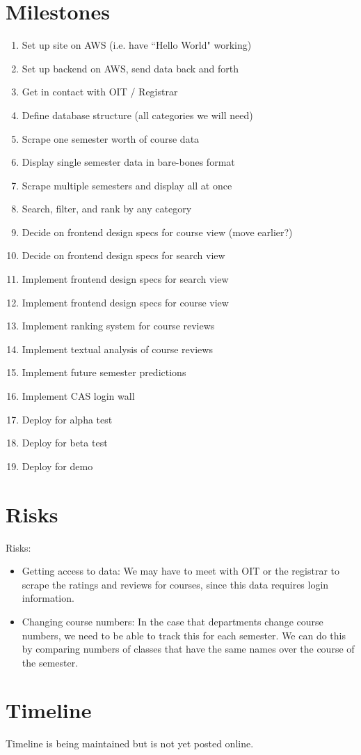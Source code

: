 \documentclass[11pt]{article}
\begin{document}
\section{Milestones}
\begin{enumerate}
\item Set up site on AWS (i.e. have ``Hello World" working)
\item Set up backend on AWS, send data back and forth
\item Get in contact with OIT / Registrar
\item Define database structure (all categories we will need)
\item Scrape one semester worth of course data
\item Display single semester data in bare-bones format
\item Scrape multiple semesters and display all at once
\item Search, filter, and rank by any category
\item Decide on frontend design specs for course view (move earlier?)
\item Decide on frontend design specs for search view
\par [No particular order from here on out]
\item Implement frontend design specs for search view
\item Implement frontend design specs for course view
\item Implement ranking system for course reviews
\item Implement textual analysis of course reviews
\item Implement future semester predictions
\item Implement CAS login wall
\item Deploy for alpha test
\item Deploy for beta test
\item Deploy for demo
\end{enumerate}

\section{Risks}
Risks:
\begin{itemize}
\item Getting access to data: We may have to meet with OIT or the registrar to scrape the ratings and reviews for courses, since this data requires login information.
\item Changing course numbers: In the case that departments change course numbers, we need to be able to track this for each semester. We can do this by comparing numbers of classes that have the same names over the course of the semester.
\end{itemize}

\section{Timeline}
Timeline is being maintained but is not yet posted online.
\end{document}

